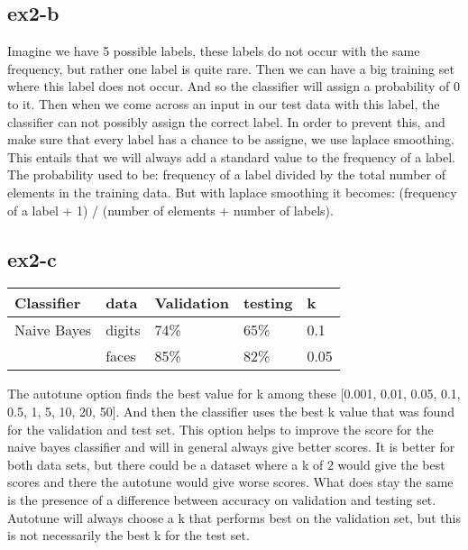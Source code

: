 \subsection{ex2-b}
Imagine we have 5 possible labels, these labels do not occur with the same frequency, but rather
one label is quite rare. Then we can have a big training set where this label does not occur. 
And so the classifier will assign a probability of 0 to it. Then when we come across an input
in our test data with this label, the classifier can not possibly assign the correct label.
In order to prevent this, and make sure that every label has a chance to be assigne, we use 
laplace smoothing. 
This entails that we will always add a  standard value to the frequency of a label. 
The probability used to be: frequency of a label divided by the total number of elements 
in the training data. But with laplace smoothing it becomes: (frequency of a label + 1) /
 (number of elements + number of labels).

\subsection{ex2-c}
\begin{table}[]
\begin{tabular}{|l|l||l|l||l|}
\hline
Classifier    & data   & Validation & testing & k \\ \hline
Naive Bayes   & digits & 74\%       & 65\%    & 0.1 \\ 
              & faces  & 85\%       & 82\%    & 0.05 \\ \hline
\end{tabular}
\end{table}

The autotune option finds the best value for k among these [0.001, 0.01, 0.05, 0.1, 0.5, 
1, 5, 10, 20, 50]. And then the classifier uses the best k value that was found for the
validation and test set. 
This option helps to improve the score for the naive bayes classifier and will in general 
always give better scores. It is better for both data sets, but there could be a dataset 
where a k of 2 would give the best scores and there the autotune would give worse scores.
What does stay the same is the presence of a difference between accuracy on validation and 
testing set. Autotune will always choose a k that performs best on the validation set, 
but this is not necessarily the best k for the test set.

